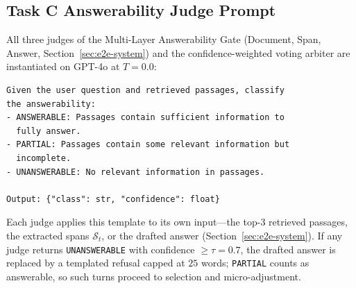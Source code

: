 \subsection{Task C Answerability Judge Prompt}
\label{subsec:prompt-answerability}

All three judges of the Multi-Layer Answerability Gate (Document, Span, Answer, Section~\ref{sec:e2e-system}) and the confidence-weighted voting arbiter are instantiated on GPT-4o at $T{=}0.0$:
\begin{verbatim}
Given the user question and retrieved passages, classify 
the answerability:
- ANSWERABLE: Passages contain sufficient information to 
  fully answer.
- PARTIAL: Passages contain some relevant information but 
  incomplete.
- UNANSWERABLE: No relevant information in passages.

Output: {"class": str, "confidence": float}
\end{verbatim}
Each judge applies this template to its own input---the top-$3$ retrieved passages, the extracted spans $\mathcal{S}_t$, or the drafted answer (Section~\ref{sec:e2e-system}). If any judge returns \texttt{UNANSWERABLE} with confidence $\geq \tau{=}0.7$, the drafted answer is replaced by a templated refusal capped at $25$ words; \texttt{PARTIAL} counts as answerable, so such turns proceed to selection and micro-adjustment.
